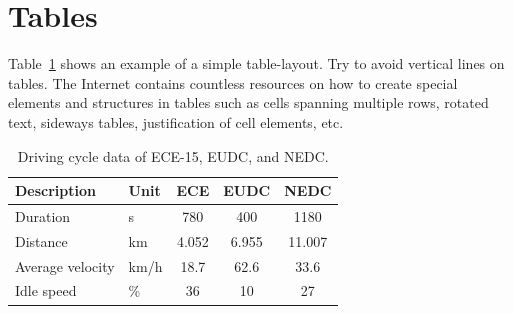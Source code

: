 \section{Tables}\label{sec:tables}
Table~\ref{tab:table} shows an example of a simple table-layout. Try to avoid vertical lines on tables. The Internet contains countless resources on how to create special elements and structures in tables such as cells spanning multiple rows, rotated text, sideways tables, justification of cell elements, etc.
\begin{table}[ht]
\begin{center}
\caption{Driving cycle data of ECE-15, EUDC, and NEDC.}\vspace{1ex}
\label{tab:table}
\begin{tabular}{llccc}\hline
Description & Unit & ECE & EUDC & NEDC \\ \hline
Duration & s & 780 & 400 & 1180 \\
Distance & km & 4.052 & 6.955 & 11.007 \\
Average velocity & km/h & 18.7 &  62.6 & 33.6 \\
Idle speed & \% & 36 & 10 & 27 \\ \hline
\end{tabular}
\end{center}
\end{table}

